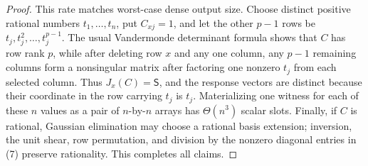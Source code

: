 \documentclass{article}
\begin{document}
\begin{proof}
This rate matches worst-case dense output size. Choose distinct positive rational numbers \(t_1,\ldots,t_n\), put \(C_{xj}=1\), and let the other \(p-1\) rows be \(t_j,t_j^2,\ldots,t_j^{p-1}\). The usual Vandermonde determinant formula shows that \(C\) has row rank \(p\), while after deleting row \(x\) and any one column, any \(p-1\) remaining columns form a nonsingular matrix after factoring one nonzero \(t_j\) from each selected column. Thus \(J_x(C)=\mathsf S\), and the response vectors are distinct because their coordinate in the row carrying \(t_j\) is \(t_j\). Materializing one witness for each of these \(n\) values as a pair of \(n\)-by-\(n\) arrays has \(\Theta(n^3)\) scalar slots. Finally, if \(C\) is rational, Gaussian elimination may choose a rational basis extension; inversion, the unit shear, row permutation, and division by the nonzero diagonal entries in (7) preserve rationality. This completes all claims.
\end{proof}
\end{document}
